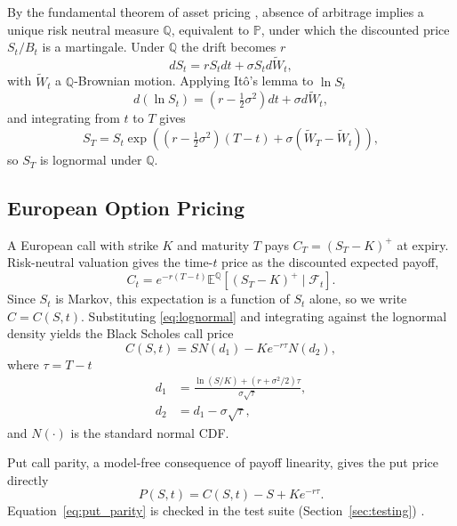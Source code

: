 \documentclass[twocolumn,10pt]{article}
\begin{document}
By the fundamental theorem of asset pricing \cite{Harrison1979}, absence of arbitrage implies a unique risk neutral measure $\mathbb{Q}$, equivalent to $\mathbb{P}$, under which the discounted price $S_t/B_t$ is a martingale. Under $\mathbb{Q}$ the drift becomes $r$
\begin{equation}
    dS_t = r S_t dt + \sigma S_t d\widetilde{W}_t,
    \label{eq:gbm_rn}
\end{equation}
with $\widetilde{W}_t$ a $\mathbb{Q}$-Brownian motion. Applying It\^{o}'s lemma to $\ln S_t$
\begin{equation}
    d(\ln S_t) = \left(r - \tfrac{1}{2}\sigma^2\right) dt + \sigma d\widetilde{W}_t,
\end{equation}
and integrating from $t$ to $T$ gives
\begin{equation}
    S_T = S_t \exp\left( \left(r - \tfrac{1}{2}\sigma^2\right)(T-t) + \sigma (\widetilde{W}_T - \widetilde{W}_t) \right),
    \label{eq:lognormal}
\end{equation}
so $S_T$ is lognormal under $\mathbb{Q}$.

\subsection{European Option Pricing}
A European call with strike $K$ and maturity $T$ pays $C_T = (S_T - K)^+$ at expiry. Risk-neutral valuation gives the time-$t$ price as the discounted expected payoff,
\begin{equation}
    C_t = e^{-r(T-t)} \mathbb{E}^{\mathbb{Q}}\left[ (S_T - K)^+ \mid \mathcal{F}_t \right].
    \label{eq:rn_price}
\end{equation}
Since $S_t$ is Markov, this expectation is a function of $S_t$ alone, so we write $C = C(S,t)$. Substituting \eqref{eq:lognormal} and integrating against the lognormal density yields the Black Scholes call price
\begin{equation}
    C(S,t) = S N(d_1) - K e^{-r\tau} N(d_2),
    \label{eq:bs_call}
\end{equation}
where $\tau = T-t$
\begin{align}
    d_1 &= \frac{\ln(S/K) + (r + \sigma^2/2)\tau}{\sigma \sqrt{\tau}}, \\
    d_2 &= d_1 - \sigma \sqrt{\tau},
\end{align}
and $N(\cdot)$ is the standard normal CDF.

Put call parity, a model-free consequence of payoff linearity, gives the put price directly
\begin{equation}
    P(S,t) = C(S,t) - S + K e^{-r\tau}.
    \label{eq:put_parity}
\end{equation}
Equation~\eqref{eq:put_parity} is checked  in the test suite (Section~\ref{sec:testing}) .
\end{document}
